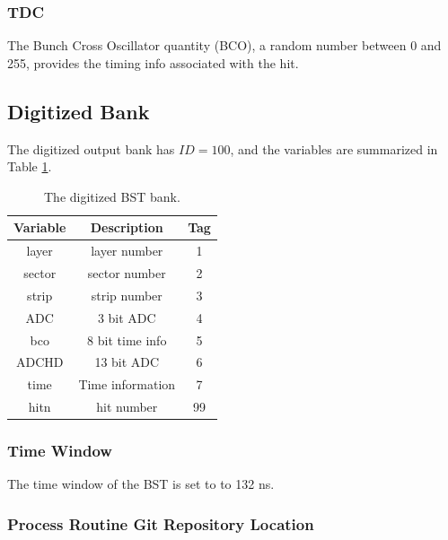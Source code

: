 \subsubsection{TDC}
The Bunch Cross Oscillator quantity (BCO), a random number between 0 and 255,
provides the timing info associated with the hit.

\subsection{Digitized Bank}
The digitized output bank has $ID=100$, and the variables are summarized in Table \ref{tab:bstBank}.

\begin{table}[h]
	\begin{center}
		\begin{tabular}{| c | c | c |}
			\hline \hline
			Variable         & Description  & Tag  \\
			\hline
               layer  &                                      layer number  &    1   \\
              sector  &                                     sector number  &    2   \\
               strip  &                                      strip number  &    3   \\
                 ADC  &                                         3 bit ADC  &    4   \\
                 bco  &                                   8 bit time info  &    5   \\
               ADCHD  &                                        13 bit ADC  &    6   \\
                time  &                                  Time information  &    7   \\
                hitn  &                                        hit number  &   99   \\
			\hline \hline
		\end{tabular}
	\end{center}
	\caption{The digitized BST bank.}\label{tab:bstBank}
\end{table}


\subsubsection{Time Window}
The time window  of the BST is set to to 132 ns.

\subsubsection{Process Routine Git Repository Location}


